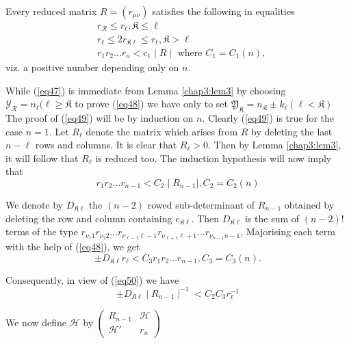 \begin{lem}\label{chap3:lem4} %
Every reduced matrix $ R = ( r_{\mu \nu }) $ satisfies the
  following in equalities  
\begin{align*}
 &r_\mathcal{R } \leq r_\ell , \mathfrak{K} \leq \ell \tag{47}\label{eq47}  \\
 &r_\ell \leq  2 r_{\mathfrak{K} \ell}  \leq r_\ell ,   \mathfrak{K} >
  \ell \tag{48}\label{eq48}  \\ 
 &r_1 r_2 \ldots r_n  < c_1 \mid R \mid \text{ where } C_1 = C_1 ( n
  ),  \tag{49}\label{eq49}  
\end{align*}
viz. a positive number  depending only on $n$.
\end{lem}

While (\ref{eq47}) is immediate from Lemma \ref{chap3:lem3} by choosing $
\mathscr{Y}_\mathcal{R} = n_\ell ( \ell \ge \mathfrak{K}$  to prove 
(\ref{eq48})  we have only to set $ \mathfrak{Y}_\mathfrak{K} = n_\mathfrak{K}
\pm  k_\ell ( \ell < \mathfrak{K} )$ The proof of (\ref{eq49}) will be by
induction on $n$. Clearly (\ref{eq49}) is true for the case $n = 1$. Let $
R_\ell $ denote the matrix which arises from $R$ by deleting the last
$n -\ell $ rows and  columns. It is clear that  $ R_\ell > 0 $. Then
by Lemma \ref{chap3:lem3}, it will follow that $ R_\ell $ is reduced too. The
induction hypothesis will now  imply that  
\begin{equation*}
 r_1 r_2 \ldots r_{n-1}   < C_2 \mid R_{n-1} \mid,  C_2 = C_2 (n)
 \tag{50}\label{eq50} 
\end{equation*}

We denote by $D_{ \mathfrak{K} \ell } $ the $ (n-2) $ rowed
sub-determinant of $ R_{n-1} $ obtained by deleting the row and column
containing $ e_{\mathfrak{K} \ell } $. Then $ D_{\mathfrak{K} \ell } $
is the sum of  $ ( n-2 ) $! terms of the type $ r_{\nu_1 1}
r_{\nu_2 2} \ldots r_{\nu_{\ell-1} \ell-1} r_{\nu_{\ell+1} \ell+1}
\ldots r_{\nu_{n-1} n-1} $, Majorising each term with the help of
(\ref{eq48}), we get 
$$
\pm D_{\mathfrak{K} \ell } r_\ell < C_3 r_1 r_2 \ldots r_{n-1}, C_3 =
C_3 (n). 
$$

Consequently, in view of (\ref{eq50}) we have 
$$
\pm  D_{\mathfrak{K} \ell} \mid R_{n-1} \mid^{-1}  < C_2 C_3 r^{-1}_{\ell}
$$

We now define $ \mathscr{H}$  by $ \begin{pmatrix} R_{n-1} &
  \mathscr{H} \\\mathscr{H}'& r_n \end{pmatrix} $ 

